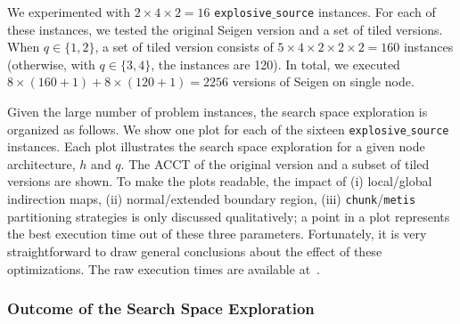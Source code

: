 We experimented with $2 \times 4 \times 2 = 16$ {\tt explosive$\_$source} instances. For each of these instances, we tested the original Seigen version and a set of tiled versions. When $q \in \lbrace 1, 2 \rbrace$, a set of tiled version consists of $5 \times 4 \times 2 \times 2 \times 2 = 160$ instances (otherwise, with $q \in \lbrace 3, 4 \rbrace$, the instances are 120). In total, we executed $8 \times (160 + 1) + 8 \times (120 + 1) = 2256$ versions of Seigen on single node. 

Given the large number of problem instances, the search space exploration is organized as follows. We show one plot for each of the sixteen {\tt explosive$\_$source} instances. Each plot illustrates the search space exploration for a given node architecture, $h$ and $q$. The ACCT of the original version and a subset of tiled versions are shown. To make the plots readable, the impact of (i) local/global indirection maps, (ii) normal/extended boundary region, (iii) {\tt chunk}/{\tt metis} partitioning strategies is only discussed qualitatively; a point in a plot represents the best execution time out of these three parameters. Fortunately, it is very straightforward to draw general conclusions about the effect of these optimizations. The raw execution times are available at~\cite{phd-thesis-repo}.

\subsubsection{Outcome of the Search Space Exploration}

